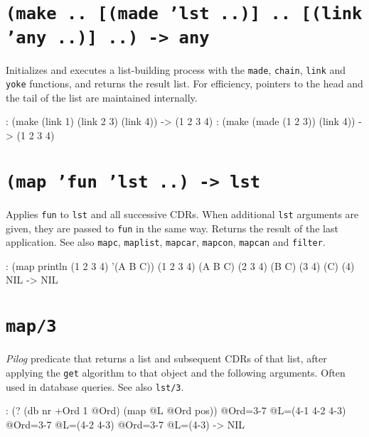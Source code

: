  
\section*{\texttt{(make .. [(made 'lst ..)] .. [(link 'any ..)] ..) -> any}}
\label{sec:func-ref-M-(make .. [(made 'lst ..)] .. [(link 'any ..)] ..) -> any}


Initializes and executes a list-building process with the \texttt{made},
\texttt{chain}, \texttt{link} and \texttt{yoke} functions, and returns the result list. For
efficiency, pointers to the head and the tail of the list are maintained
internally.


\begin{wideverbatim}
: (make (link 1) (link 2 3) (link 4))
-> (1 2 3 4)
: (make (made (1 2 3)) (link 4))
-> (1 2 3 4)
\end{wideverbatim}

 
\section*{\texttt{(map 'fun 'lst ..) -> lst}}
\label{sec:func-ref-M-(map 'fun 'lst ..) -> lst}


Applies \texttt{fun} to \texttt{lst} and all successive CDRs. When additional \texttt{lst}
arguments are given, they are passed to \texttt{fun} in the same way. Returns
the result of the last application. See also \texttt{mapc}, \texttt{maplist},
\texttt{mapcar}, \texttt{mapcon}, \texttt{mapcan} and \texttt{filter}.


\begin{wideverbatim}
: (map println (1 2 3 4) '(A B C))
(1 2 3 4) (A B C)
(2 3 4) (B C)
(3 4) (C)
(4) NIL
-> NIL
\end{wideverbatim}

 
\section*{\texttt{map/3}}
\label{sec:func-ref-M-map/3}


\emph{Pilog} predicate that returns a list and subsequent
CDRs of that list, after applying the \texttt{get} algorithm to that object and
the following arguments. Often used in database queries. See also
\texttt{lst/3}.


\begin{wideverbatim}
: (? (db nr +Ord 1 @Ord) (map @L @Ord pos))
 @Ord={3-7} @L=({4-1} {4-2} {4-3})
 @Ord={3-7} @L=({4-2} {4-3})
 @Ord={3-7} @L=({4-3})
-> NIL
\end{wideverbatim}

